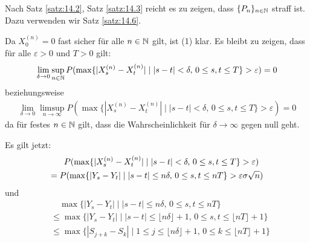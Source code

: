 \documentclass[a4paper,twoside,DIV15,BCOR12mm]{scrbook}
\begin{document}
\begin{beweis}
Nach Satz \ref{satz:14.2}, Satz \ref{satz:14.3} reicht es zu zeigen, dass $\{P_n\}_{n\in\mathbb{N}}$ straff ist. Dazu verwenden wir Satz \ref{satz:14.6}.

Da $X_0^{(n)}=0$ fast sicher für alle $n\in\mathbb{N}$ gilt, ist (1) klar. Es bleibt zu zeigen, dass für alle $\varepsilon>0$ und $T>0$ gilt:
\begin{align*}
\lim_{\delta \to 0}\sup_{n\in\mathbb{N}} P(\max\{ |X_s^{(n)} - X_t^{(n)}| \mid |s-t|<\delta,\, 0\le s,t\le T\} >\varepsilon ) = 0
\end{align*}
beziehungsweise
\begin{align*}
\lim_{\delta \to 0}\limsup_{n\to\infty} P(\max\{ |X_s^{(n)} - X_t^{(n)}| \mid |s-t|<\delta,\, 0\le s,t\le T\} >\varepsilon ) = 0
\end{align*}
da für festes $n\in\mathbb{N}$ gilt, dass die Wahrscheinlichkeit für $\delta\to\infty$ gegen null geht.

Es gilt jetzt:
\begin{multline*}
\phantom{=\strut} P(\max\{ |X_s^{(n)} - X_t^{(n)}| \mid |s-t|<\delta,\, 0\le s,t\le T\} >\varepsilon ) \\
= P(\max\{ |Y_s-Y_t|  \mid |s-t|\le n\delta ,\, 0\le s,t\le nT\} > \varepsilon \sigma \sqrt n) 
\end{multline*}
und
\begin{align*}
&\quad\max\{ |Y_s-Y_t|  \mid |s-t|\le n\delta ,\, 0\le s,t\le nT\} \\
&\le \max\{ |Y_s-Y_t|  \mid |s-t|\le \lfloor n\delta\rfloor +1 ,\, 0\le s,t\le \lfloor nT\rfloor +1\}  \\
&\le \max\{ |S_{j+k}-S_k|  \mid 1\le j \le  \lfloor n\delta\rfloor +1 ,\, 0\le k\le \lfloor nT\rfloor +1\} 
\end{align*}


\end{beweis}
\end{document}
